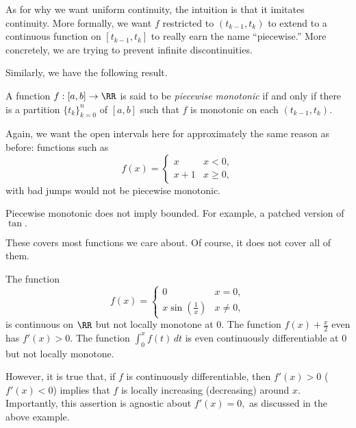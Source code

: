 As for why we want uniform continuity, the intuition is that it imitates continuity. More formally, we want $f$ restricted to $(t_{k-1},t_k)$ to extend to a continuous function on $[t_{k-1},t_k]$ to really earn the name ``piecewise.'' More concretely, we are trying to prevent infinite discontinuities.

Similarly, we have the following result.
\begin{definition}
	A function $f:[a,b]\to\RR$ is said to be \textit{piecewise monotonic} if and only if there is a partition $\{t_k\}_{k=0}^n$ of $[a,b]$ such that $f$ is monotonic on each $(t_{k-1},t_k).$
\end{definition}
Again, we want the open intervals here for approximately the same reason as before: functions such as
\[f(x)=\begin{cases}
	x & x<0, \\
	x+1 & x\ge0,
\end{cases}\]
with bad jumps would not be piecewise monotonic.
\begin{warn}
	Piecewise monotonic does not imply bounded. For example, a patched version of $\tan.$
\end{warn}

These covers most functions we care about. Of course, it does not cover all of them.
\begin{nex}
	The function
	\[f(x)=\begin{cases}
		0 & x=0, \\
		x\sin\left(\frac1x\right) & x\ne0,
	\end{cases}\]
	is continuous on $\RR$ but not locally monotone at $0.$ The function $f(x)+\frac x2$ even has $f'(x)>0.$ The function $\int_0^xf(t)\,dt$ is even continuously differentiable at $0$ but not locally monotone.
\end{nex}
However, it is true that, if $f$ is continuously differentiable, then $f'(x)>0$ ($f'(x)<0$) implies that $f$ is locally increasing (decreasing) around $x.$ Importantly, this assertion is agnostic about $f'(x)=0,$ as discussed in the above example.

